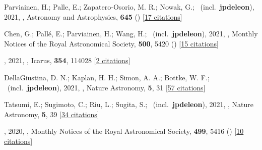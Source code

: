 \item[{\color{numcolor}\scriptsize138}] Parviainen, H.; Palle, E.; Zapatero-Osorio, M. R.; Nowak, G.; \etal\ (incl.\ \textbf{jpdeleon}), 2021, , Astronomy and Astrophysics, \textbf{645} () [\href{https://ui.adsabs.harvard.edu/abs/2021A&A...645A..16P}{17 citations}]

\item[{\color{numcolor}\scriptsize137}] Chen, G.; Pall{\'e}, E.; Parviainen, H.; Wang, H.; \etal\ (incl.\ \textbf{jpdeleon}), 2021, , Monthly Notices of the Royal Astronomical Society, \textbf{500}, 5420 () [\href{https://ui.adsabs.harvard.edu/abs/2021MNRAS.500.5420C}{15 citations}]

\item[{\color{numcolor}\scriptsize136}] , 2021, , Icarus, \textbf{354}, 114028 [\href{https://ui.adsabs.harvard.edu/abs/2021Icar..35414028A}{2 citations}]

\item[{\color{numcolor}\scriptsize135}] DellaGiustina, D. N.; Kaplan, H. H.; Simon, A. A.; Bottke, W. F.; \etal\ (incl.\ \textbf{jpdeleon}), 2021, , Nature Astronomy, \textbf{5}, 31 [\href{https://ui.adsabs.harvard.edu/abs/2021NatAs...5...31D}{57 citations}]

\item[{\color{numcolor}\scriptsize134}] Tatsumi, E.; Sugimoto, C.; Riu, L.; Sugita, S.; \etal\ (incl.\ \textbf{jpdeleon}), 2021, , Nature Astronomy, \textbf{5}, 39 [\href{https://ui.adsabs.harvard.edu/abs/2021NatAs...5...39T}{34 citations}]

\item[{\color{numcolor}\scriptsize133}] , 2020, , Monthly Notices of the Royal Astronomical Society, \textbf{499}, 5416 () [\href{https://ui.adsabs.harvard.edu/abs/2020MNRAS.499.5416C}{10 citations}]

